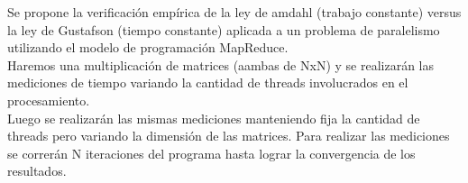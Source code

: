 Se propone la verificación empírica de la ley de amdahl  (trabajo constante)
versus la ley de  Gustafson (tiempo constante) aplicada a un problema de
paralelismo utilizando el modelo de programación MapReduce.\\
Haremos una multiplicación de matrices (aambas de NxN) y se realizarán las
mediciones de tiempo variando la cantidad de threads involucrados en el
procesamiento.\\
Luego se realizarán las mismas mediciones manteniendo fija la cantidad de
threads pero variando la dimensión de las matrices.
Para realizar las mediciones se correrán N iteraciones del programa hasta
lograr la convergencia de los resultados.
